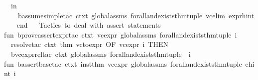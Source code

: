 \begin{isabellebody}
\ \ in\isanewline
\ \ \ \ {\isacharparenleft}{\kern0pt}b{\isacharunderscore}{\kern0pt}assume{\isacharunderscore}{\kern0pt}simple{\isacharunderscore}{\kern0pt}tac\ ctxt\ global{\isacharunderscore}{\kern0pt}assms\ forall{\isacharunderscore}{\kern0pt}and{\isacharunderscore}{\kern0pt}exists{\isacharunderscore}{\kern0pt}thm{\isacharunderscore}{\kern0pt}tuple\ vc{\isacharunderscore}{\kern0pt}elim\ expr{\isacharunderscore}{\kern0pt}hint\ {}{\isacharparenright}{\kern0pt}\isanewline
\ \ end\isanewline
{\isacartoucheclose}\isanewline
\isanewline
{}\isamarkupfalse%
\ {\isacartoucheopen}\isanewline
{\isacharparenleft}{\kern0pt}{\isacharasterisk}{\kern0pt}{\isacharasterisk}{\kern0pt}\ Tactics\ to\ deal\ with\ assert\ statements\ {\isacharasterisk}{\kern0pt}{\isacharasterisk}{\kern0pt}{\isacharparenright}{\kern0pt}\isanewline
\isanewline
fun\ b{\isacharunderscore}{\kern0pt}prove{\isacharunderscore}{\kern0pt}assert{\isacharunderscore}{\kern0pt}expr{\isacharunderscore}{\kern0pt}tac\ ctxt\ vc{\isacharunderscore}{\kern0pt}expr\ global{\isacharunderscore}{\kern0pt}assms\ forall{\isacharunderscore}{\kern0pt}and{\isacharunderscore}{\kern0pt}exists{\isacharunderscore}{\kern0pt}thm{\isacharunderscore}{\kern0pt}tuple\ i\ {\isacharequal}{\kern0pt}\isanewline
\ \ {\isacharparenleft}{\kern0pt}resolve{\isacharunderscore}{\kern0pt}tac\ ctxt\ {\isacharbrackleft}{\kern0pt}{\isacharat}{\kern0pt}{\isacharbraceleft}{\kern0pt}thm\ vc{\isacharunderscore}{\kern0pt}to{\isacharunderscore}{\kern0pt}expr{\isacharbraceright}{\kern0pt}\ OF\ {\isacharbrackleft}{\kern0pt}vc{\isacharunderscore}{\kern0pt}expr{\isacharbrackright}{\kern0pt}{\isacharbrackright}{\kern0pt}\ i{\isacharparenright}{\kern0pt}\ THEN\isanewline
\ \ {\isacharparenleft}{\kern0pt}b{\isacharunderscore}{\kern0pt}vc{\isacharunderscore}{\kern0pt}expr{\isacharunderscore}{\kern0pt}rel{\isacharunderscore}{\kern0pt}tac\ ctxt\ global{\isacharunderscore}{\kern0pt}assms\ forall{\isacharunderscore}{\kern0pt}and{\isacharunderscore}{\kern0pt}exists{\isacharunderscore}{\kern0pt}thm{\isacharunderscore}{\kern0pt}tuple\ {\isacharbrackleft}{\kern0pt}{\isacharbrackright}{\kern0pt}\ i{\isacharparenright}{\kern0pt}\isanewline
\isanewline
fun\ b{\isacharunderscore}{\kern0pt}assert{\isacharunderscore}{\kern0pt}base{\isacharunderscore}{\kern0pt}tac\ ctxt\ inst{\isacharunderscore}{\kern0pt}thm\ vc{\isacharunderscore}{\kern0pt}expr\ global{\isacharunderscore}{\kern0pt}assms\ forall{\isacharunderscore}{\kern0pt}and{\isacharunderscore}{\kern0pt}exists{\isacharunderscore}{\kern0pt}thm{\isacharunderscore}{\kern0pt}tuple\ ehint\ i\ {\isacharequal}{\kern0pt}\isanewline

\end{isabellebody}
